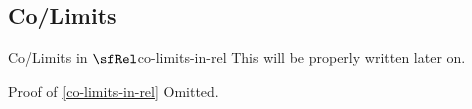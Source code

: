 \subsection{Co/Limits}\label{subsection-co-limits-in-rel}
\begin{proposition}{Co/Limits in $\sfRel$}{co-limits-in-rel}%
    This will be properly written later on.
\end{proposition}
\begin{Proof}{Proof of \cref{co-limits-in-rel}}%
    Omitted.
\end{Proof}
